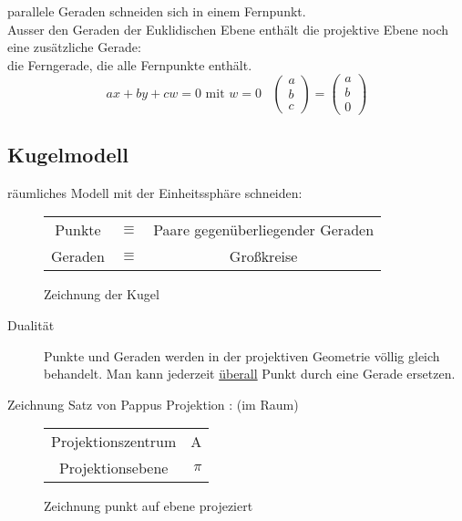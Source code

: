 \documentclass[11pt]{article}
\begin{document}
parallele Geraden schneiden sich in einem Fernpunkt.\\

Ausser den Geraden der Euklidischen Ebene enthält die projektive Ebene noch eine zusätzliche Gerade:\\
die Ferngerade, die alle Fernpunkte enthält.
$$ ax + by + cw = 0 \text{ mit }w=0 \; \; \;
\begin{pmatrix}
a \\ b \\ c
\end{pmatrix}
=
\begin{pmatrix}
a \\ b \\ 0
\end{pmatrix}
$$
\subsection{Kugelmodell}
räumliches Modell mit der Einheitssphäre schneiden:
\begin{figure}[!hb]
\begin{minipage}[l]{6cm}
\begin{tabular}{ccc}
Punkte & $\equiv$ & Paare gegenüberliegender Geraden \\
Geraden & $\equiv$ & Großkreise
\end{tabular}
\end{minipage}
\hfill
\begin{minipage}[c]{8cm}
{\color{red}Zeichnung der Kugel}
\end{minipage}
\end{figure}

\begin{description}
\item[Dualität] Punkte und Geraden werden in der projektiven Geometrie völlig gleich behandelt. Man kann jederzeit \underline{überall} Punkt durch eine Gerade ersetzen.
\end{description}
{\color{red}Zeichnung Satz von Pappus}
Projektion : (im Raum)\\
\begin{figure}[!hb]
\begin{minipage}[l]{4cm}
\begin{tabular}{cr}
Projektionszentrum &  A \\
Projektionsebene & $\pi$
\end{tabular}
\end{minipage}
\hfill
\begin{minipage}[c]{8cm}
{\color{red}Zeichnung punkt auf ebene projeziert}
\end{minipage}
\end{figure}
\end{document}
